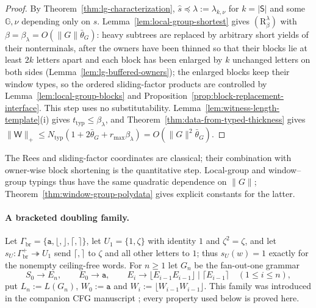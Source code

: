 \documentclass[11pt]{article}
\numberwithin{equation}{section}
\theoremstyle{plain}
\theoremstyle{definition}
\theoremstyle{remark}
\newcommand{\Wit}{\mathsf{W}}
\begin{document}
\begin{proof}
By Theorem~\ref{thm:lg-characterization}, $\widehat s\preceq\lambda:=\lambda_{k,\nu}$
for $k=|\mathsf S|$ and some ${\mathbb G},\nu$ depending only on $s$.
Lemma~\ref{lem:local-group-shortest} gives $(\mathrm R_\beta^\lambda)$ with
$\beta=\beta_\lambda=O(\|G\|\bar\theta_G)$: heavy subtrees are replaced by
arbitrary short yields of their nonterminals, after the owners have been thinned
so that their blocks lie at least $2k$ letters apart and each block has been
enlarged by $k$ unchanged letters on both sides
(Lemma~\ref{lem:lg-buffered-owners}); the enlarged blocks keep their window
types, so the ordered sliding-factor products are controlled by
Lemma~\ref{lem:local-group-blocks} and
Proposition~\ref{prop:block-replacement-interface}.  This step uses no
substitutability.  Lemma~\ref{lem:witness-length-template}(i) gives
$t_{\mathrm{typ}}\le\beta_\lambda$, and
Theorem~\ref{thm:data-from-typed-thickness} gives
$\|\Wit\|_+\le N_{\mathrm{typ}}(1+2\bar\theta_G+r_{\max}\beta_\lambda)
=O(\|G\|^2\bar\theta_G)$.
\end{proof}

The Rees and sliding-factor coordinates are classical; their combination with
owner-wise block shortening is the quantitative step.  Local-group and
window--group typings thus have the same quadratic dependence on $\|G\|$;
Theorem~\ref{thm:window-group-polydata} gives explicit constants for the
latter.

\paragraph{A bracketed doubling family.}
Let $\Gamma_{\mathrm{br}}=\{\mathtt a,\lfloor,\rfloor,\lceil,\rceil\}$, let
$U_1=\{1,\zeta\}$ with identity $1$ and $\zeta^2=\zeta$, and let
$s_U:\Gamma_{\mathrm{br}}^+\twoheadrightarrow U_1$ send $\lceil,\rceil$ to
$\zeta$ and all other letters to $1$; thus $s_U(w)=1$ exactly for the
nonempty ceiling-free words. For $n\ge1$ let $G_n$ be the fan-out-one grammar
\[
 S_0\to E_n,\qquad E_0\to\mathtt a,\qquad
 E_i\to\lfloor E_{i-1}E_{i-1}\rfloor
   \mid\lceil E_{i-1}\rceil\quad(1\le i\le n),
\]
put $L_n:=L(G_n)$, $W_0:=\mathtt a$ and
$W_i:=\lfloor W_{i-1}W_{i-1}\rfloor$. This family was introduced in the
companion CFG manuscript \cite[Proposition~6.4]{kuriyamaCFG}; every
property used below is proved here.
\end{document}
